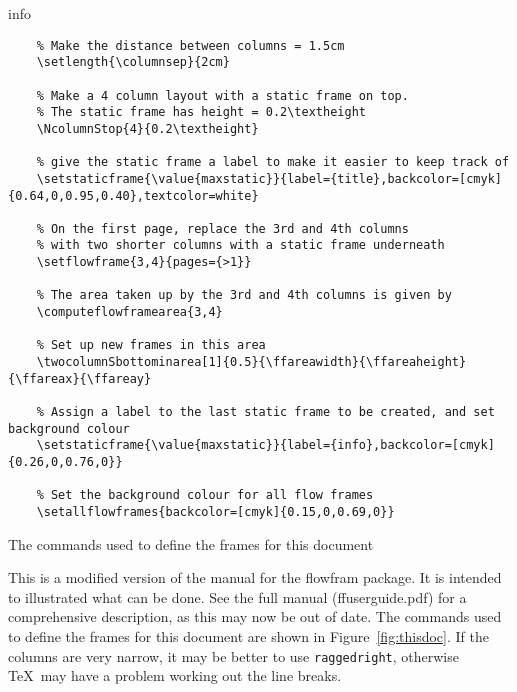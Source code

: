 \documentclass[a0]{a0poster}
\newcommand{\sty}[1]{\textsf{#1}}
\newcommand{\cmdname}[1]{\texttt{\symbol{92}#1}}
\begin{document}

\pagestyle{empty}

\begin{staticcontents*}{info}
\begin{staticfigure}

\begin{verbatim}
    % Make the distance between columns = 1.5cm
    \setlength{\columnsep}{2cm}

    % Make a 4 column layout with a static frame on top.
    % The static frame has height = 0.2\textheight
    \NcolumnStop{4}{0.2\textheight}

    % give the static frame a label to make it easier to keep track of
    \setstaticframe{\value{maxstatic}}{label={title},backcolor=[cmyk]{0.64,0,0.95,0.40},textcolor=white}

    % On the first page, replace the 3rd and 4th columns
    % with two shorter columns with a static frame underneath
    \setflowframe{3,4}{pages={>1}}

    % The area taken up by the 3rd and 4th columns is given by
    \computeflowframearea{3,4}
    
    % Set up new frames in this area
    \twocolumnSbottominarea[1]{0.5}{\ffareawidth}{\ffareaheight}{\ffareax}{\ffareay}

    % Assign a label to the last static frame to be created, and set background colour
    \setstaticframe{\value{maxstatic}}{label={info},backcolor=[cmyk]{0.26,0,0.76,0}}

    % Set the background colour for all flow frames
    \setallflowframes{backcolor=[cmyk]{0.15,0,0.69,0}}
\end{verbatim}

\caption{The commands used to define the frames for this document}
\protect\label{fig:thisdoc}
\end{staticfigure}
\end{staticcontents*}

This is a modified version of the manual for the \sty{flowfram} 
package.  It is intended to illustrated what can be done. See the 
full manual (ffuserguide.pdf) for
a comprehensive description, as this may now be out of date. The commands used to define the frames for
this document are shown in Figure~\ref{fig:thisdoc}.
If the columns are very narrow, it may be better to
use \cmdname{raggedright}, otherwise \TeX\ may have a
problem working out the line breaks.
\end{document}
